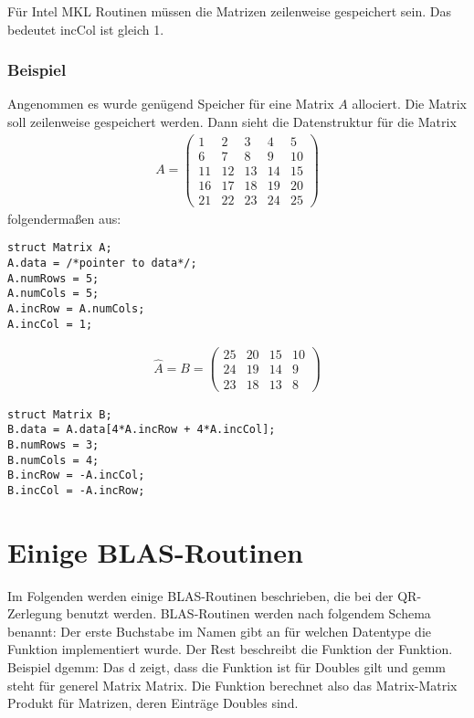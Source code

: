 Für Intel MKL Routinen müssen die Matrizen zeilenweise gespeichert sein.
Das bedeutet incCol ist gleich 1.

\subsubsection{Beispiel}
Angenommen es wurde genügend Speicher für eine Matrix $A$ allociert. Die Matrix soll zeilenweise gespeichert werden. Dann sieht die Datenstruktur für die Matrix
\begin{align*}
	A = \begin{pmatrix}
	 1 &  2 &  3 &  4 &  5 \\
	 6 &  7 &  8 &  9 & 10 \\
	11 & 12 & 13 & 14 & 15 \\
	16 & 17 & 18 & 19 & 20 \\
	21 & 22 & 23 & 24 & 25 
	\end{pmatrix}
\end{align*}
folgendermaßen aus:
\begin{lstlisting}
struct Matrix A;
A.data = /*pointer to data*/;
A.numRows = 5; 
A.numCols = 5;
A.incRow = A.numCols;
A.incCol = 1;
\end{lstlisting}

\begin{align*}
\hat{A} = B = \begin{pmatrix}
25 &  20 &  15 & 10 \\
24 &  19 &  14 & 9 \\
23 &  18 &  13 & 8 
\end{pmatrix}
\end{align*}

\begin{lstlisting}
struct Matrix B;
B.data = A.data[4*A.incRow + 4*A.incCol];
B.numRows = 3; 
B.numCols = 4;
B.incRow = -A.incCol;
B.incCol = -A.incRow;
\end{lstlisting}




\newpage
\section{Einige BLAS-Routinen}
Im Folgenden werden einige BLAS-Routinen beschrieben, die bei der QR-Zerlegung benutzt werden.
BLAS-Routinen werden nach folgendem Schema benannt:
Der erste Buchstabe im Namen gibt an für welchen Datentype die Funktion implementiert wurde. Der Rest beschreibt die Funktion der Funktion.\\
Beispiel \glqq dgemm\grqq{}: Das \glqq d\grqq{} zeigt, dass die Funktion ist für Doubles gilt und  \glqq gemm\grqq{} steht für \glqq generel Matrix Matrix\grqq{}. Die  Funktion berechnet also das Matrix-Matrix Produkt für Matrizen, deren Einträge Doubles sind.

